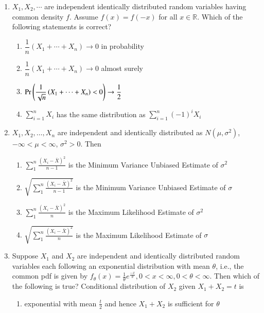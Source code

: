 \begin{enumerate}[label=\thesection.\arabic*.,ref=\thesection.\theenumi]
\solution

%
\item $X_{1}, X_{2}, \cdots$ are independent identically distributed random variables
having common density $f$. Assume $f(x)=f(-x)$ for all $x \in \mathbb{R}$. Which of the following statements is correct?
\begin{enumerate}[label=\alph*)]
\item $\dfrac{1}{n}\left(X_{1}+\cdots+X_{n}\right) \rightarrow 0$ in probability
\item $\dfrac{1}{n}\left(X_{1}+\cdots+X_{n}\right) \rightarrow 0$ almost surely
\item $\Pr\left(\dfrac{1}{\sqrt{n}}\left(X_{1}+\cdots+X_{n}\right)<0\right) \rightarrow \dfrac{1}{2}$
\item $\sum_{i=1}^{n} X_{i}$ has the same distribution as $\sum_{i=1}^{n}(-1)^{i} X_{i}$
\end{enumerate}
%
\solution

%
\item $X_1,X_2,\ldots,X_n$ are independent and identically
distributed as $N(\mu, \sigma^2)$, $-\infty < \mu < \infty$, $\sigma^2 > 0$. Then
\begin{enumerate}
    \item $\sum_1^n\frac{(X_i-\bar{X})^2}{n-1}$ is the Minimum Variance Unbiased Estimate of $\sigma^2$\\
    \item $\sqrt{\sum_1^n\frac{(X_i-\bar{X})^2}{n-1}}$ is the Minimum Variance Unbiased Estimate of $\sigma$\\
    \item $\sum_1^n\frac{(X_i-\bar{X})^2}{n}$ is the Maximum Likelihood Estimate of $\sigma^2$\\
    \item $\sqrt{\sum_1^n\frac{(X_i-\bar{X})^2}{n}}$ is the Maximum Likelihood \qquad Estimate of $\sigma$
\end{enumerate}
%
\solution

%
%
\item Suppose $X_1$ and $X_2$ are independent and identically distributed random variables each following an exponential distribution with mean $\theta$, i.e., the common pdf is given by $f_\theta(x) = \frac{1}{\theta}e^{\frac{-x}{\theta}}, 0<x<\infty,0<\theta<\infty.$ Then which of the following is true? Conditional distribution of $X_2$ given $X_1+X_2=t$ is 
\begin{enumerate}
    \item exponential with mean $\frac{t}{2}$ and hence $X_1+X_2$ is sufficient for $\theta$ \label{june/2013/40/option 1}

\end{enumerate}
\end{enumerate}
